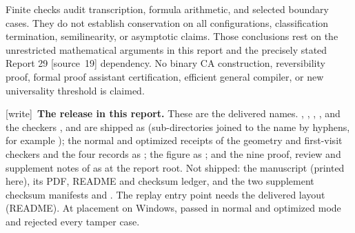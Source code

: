 \documentclass[11pt,letterpaper]{article}
\numberwithin{equation}{section}
\theoremstyle{definition}
\theoremstyle{remark}
\newcommand{\wtag}{\textup{[write]}}
\begin{document}
Finite checks audit transcription, formula arithmetic, and selected boundary cases. They do not establish conservation on all configurations, classification termination, semilinearity, or asymptotic claims. Those conclusions rest on the unrestricted mathematical arguments in this report and the precisely stated Report 29 \textup{[source~19]} dependency. No binary CA construction, reversibility proof, formal proof assistant certification, efficient general compiler, or new universality threshold is claimed.

\wtag\ \textbf{The release in this report.} These are the delivered names. , , , ,  and the checkers ,  and  are shipped as  (sub-directories joined to the name by hyphens, for example ); the normal and optimized receipts of the geometry and first-visit checkers and the four  records as ; the figure as ; and the nine proof, review and supplement notes of  as  at the report root. Not shipped: the manuscript (printed here), its PDF, README and checksum ledger, and the two supplement checksum manifests  and . The replay entry point needs the delivered layout (README). At placement on Windows,  passed in normal and optimized mode and  rejected every tamper case.
\end{document}
